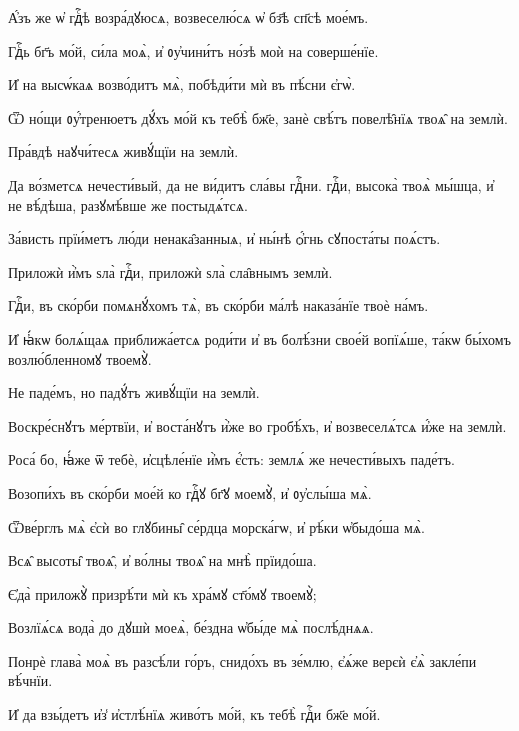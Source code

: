 \hKv А҆́зъ же ѡ҆ гдⷭ҇ѣ возра́дꙋюсѧ, возвеселю́сѧ ѡ҆ бз҃ѣ сп҃сѣ  мое́мъ.  
%

\hKv Гдⷭ҇ь бг҃ъ мо́й, си́ла моѧ̀, и҆ ᲂу҆чини́тъ но́зѣ  моѝ на соверше́нїе.  

\hKv И҆ на высѡ́каѧ возво́дитъ мѧ̀, побѣди́ти мѝ въ пѣ́сни  є҆гѡ̀. 
%

\hKv Ѿ но́щи ᲂу҆́тренюетъ дꙋ́хъ мо́й къ тебѣ̀ бж҃е, занѐ  свѣ́тъ повелѣ̑нїѧ твоѧ̑ на землѝ. 

\hKv Пра́вдѣ наꙋчи́тесѧ живꙋ́щїи на землѝ. 

\hKv Да во́зметсѧ нечести́вый, да не ви́дитъ сла́вы гдⷭ҇ни.  гдⷭ҇и, высока̀ твоѧ̀ мы́шца, и҆ не вѣ́дѣша, разꙋмѣ́вше же  постыдѧ́тсѧ. 

\hKv За́висть прїи́метъ лю́ди ненака̑занныѧ, и҆ ны́нѣ ѻ҆́гнь  сꙋпоста́ты поѧ́стъ. 
%

\hKv Приложѝ и҆̀мъ ѕла̀ гдⷭ҇и, приложѝ ѕла̀ сла̑внымъ  землѝ. 

\hKv Гдⷭ҇и, въ ско́рби помѧнꙋ́хомъ тѧ̀, въ ско́рби ма́лѣ  наказа́нїе твоѐ на́мъ.  
%

\hKv И҆ ꙗ҆́кѡ болѧ́щаѧ приближа́етсѧ роди́ти и҆ въ  болѣ́зни свое́й вопїѧ́ше, та́кѡ бы́хомъ возлю́бленномꙋ  твоемꙋ̀. 

\hKv Не паде́мъ, но падꙋ́тъ живꙋ́щїи на землѝ. 
%

\hKv Воскре́снꙋтъ ме́ртвїи, и҆ воста́нꙋтъ и҆̀же во  гробѣ́хъ, и҆ возвеселѧ́тсѧ и҆́же на землѝ. 

\hKv Роса́ бо, ꙗ҆́же ѿ тебѐ, и҆сцѣле́нїе и҆̀мъ є҆́сть:  землѧ́ же нечести́выхъ паде́тъ. 
%

\hKv Возопи́хъ въ ско́рби мое́й ко гдⷭ҇ꙋ бг҃ꙋ моемꙋ̀, и҆  ᲂу҆слы́ша мѧ̀. 

\hKv Ѿве́рглъ мѧ̀ є҆сѝ во глꙋбины̑ се́рдца морска́гѡ, и҆  рѣ́ки ѡ҆быдо́ша мѧ̀. 

\hKv Всѧ̑ высоты̑ твоѧ̑, и҆ во́лны твоѧ̑ на мнѣ̀ прїидо́ша. 

\hKv Є҆да̀ приложꙋ̀ призрѣ́ти мѝ къ хра́мꙋ ст҃о́мꙋ твоемꙋ̀;   
%

\hKv Возлїѧ́сѧ вода̀ до дꙋшѝ моеѧ̀, бе́здна ѡ҆бы́де мѧ̀  послѣ́днѧѧ.  

\hKv Понрѐ глава̀ моѧ̀ въ разсѣ́ли го́ръ, снидо́хъ въ зе́млю,  є҆ѧ́же верєѝ є҆ѧ̀ закле́пи вѣ́чнїи.  
%

\hKv И҆ да взы́детъ и҆з̾ и҆стлѣ́нїѧ живо́тъ мо́й, къ  тебѣ̀ гдⷭ҇и бж҃е мо́й.  

